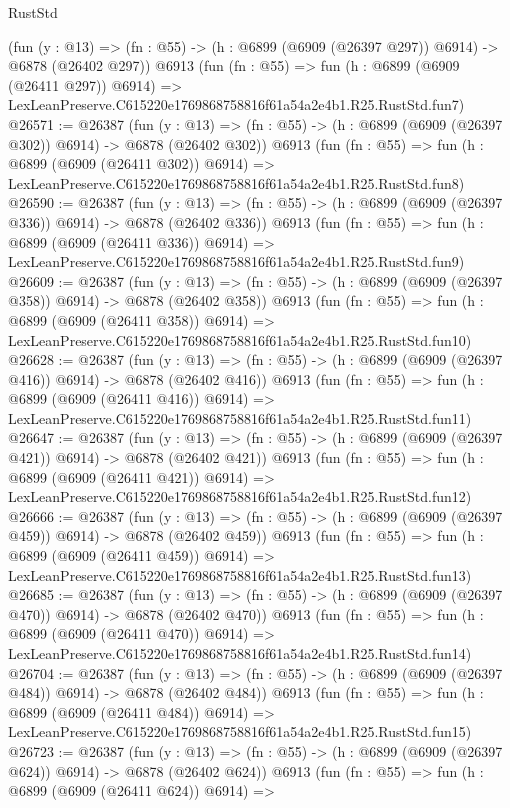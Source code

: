 \begin{lexlean}{RustStd}
\begin{coremodule}
    (fun (y : @13) => (fn : @55) -> (h : @6899 (@6909 (@26397 @297)) @6914) -> @6878 (@26402 @297))
    @6913
    (fun (fn : @55) =>
    fun (h : @6899 (@6909 (@26411 @297)) @6914) =>
    LexLeanPreserve.C615220e1769868758816f61a54a2e4b1.R25.RustStd.fun7)
@26571 := @26387
    (fun (y : @13) => (fn : @55) -> (h : @6899 (@6909 (@26397 @302)) @6914) -> @6878 (@26402 @302))
    @6913
    (fun (fn : @55) =>
    fun (h : @6899 (@6909 (@26411 @302)) @6914) =>
    LexLeanPreserve.C615220e1769868758816f61a54a2e4b1.R25.RustStd.fun8)
@26590 := @26387
    (fun (y : @13) => (fn : @55) -> (h : @6899 (@6909 (@26397 @336)) @6914) -> @6878 (@26402 @336))
    @6913
    (fun (fn : @55) =>
    fun (h : @6899 (@6909 (@26411 @336)) @6914) =>
    LexLeanPreserve.C615220e1769868758816f61a54a2e4b1.R25.RustStd.fun9)
@26609 := @26387
    (fun (y : @13) => (fn : @55) -> (h : @6899 (@6909 (@26397 @358)) @6914) -> @6878 (@26402 @358))
    @6913
    (fun (fn : @55) =>
    fun (h : @6899 (@6909 (@26411 @358)) @6914) =>
    LexLeanPreserve.C615220e1769868758816f61a54a2e4b1.R25.RustStd.fun10)
@26628 := @26387
    (fun (y : @13) => (fn : @55) -> (h : @6899 (@6909 (@26397 @416)) @6914) -> @6878 (@26402 @416))
    @6913
    (fun (fn : @55) =>
    fun (h : @6899 (@6909 (@26411 @416)) @6914) =>
    LexLeanPreserve.C615220e1769868758816f61a54a2e4b1.R25.RustStd.fun11)
@26647 := @26387
    (fun (y : @13) => (fn : @55) -> (h : @6899 (@6909 (@26397 @421)) @6914) -> @6878 (@26402 @421))
    @6913
    (fun (fn : @55) =>
    fun (h : @6899 (@6909 (@26411 @421)) @6914) =>
    LexLeanPreserve.C615220e1769868758816f61a54a2e4b1.R25.RustStd.fun12)
@26666 := @26387
    (fun (y : @13) => (fn : @55) -> (h : @6899 (@6909 (@26397 @459)) @6914) -> @6878 (@26402 @459))
    @6913
    (fun (fn : @55) =>
    fun (h : @6899 (@6909 (@26411 @459)) @6914) =>
    LexLeanPreserve.C615220e1769868758816f61a54a2e4b1.R25.RustStd.fun13)
@26685 := @26387
    (fun (y : @13) => (fn : @55) -> (h : @6899 (@6909 (@26397 @470)) @6914) -> @6878 (@26402 @470))
    @6913
    (fun (fn : @55) =>
    fun (h : @6899 (@6909 (@26411 @470)) @6914) =>
    LexLeanPreserve.C615220e1769868758816f61a54a2e4b1.R25.RustStd.fun14)
@26704 := @26387
    (fun (y : @13) => (fn : @55) -> (h : @6899 (@6909 (@26397 @484)) @6914) -> @6878 (@26402 @484))
    @6913
    (fun (fn : @55) =>
    fun (h : @6899 (@6909 (@26411 @484)) @6914) =>
    LexLeanPreserve.C615220e1769868758816f61a54a2e4b1.R25.RustStd.fun15)
@26723 := @26387
    (fun (y : @13) => (fn : @55) -> (h : @6899 (@6909 (@26397 @624)) @6914) -> @6878 (@26402 @624))
    @6913
    (fun (fn : @55) =>
    fun (h : @6899 (@6909 (@26411 @624)) @6914) =>

\end{coremodule}
\end{lexlean}
